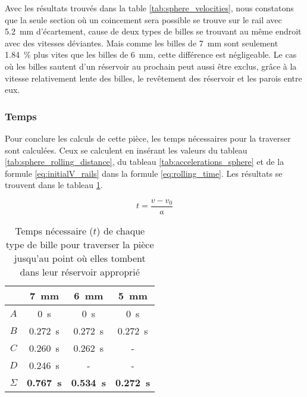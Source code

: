 Avec les résultats trouvés dans la table \ref{tab:sphere_velocities}, nous constatons que la seule section où un coincement sera possible se trouve sur le rail avec \SI{5.2}{\mm} d'écartement, cause de deux types de billes se trouvant au même endroit avec des vitesses déviantes. Mais comme les billes de \SI{7}{\mm} sont seulement \SI{1.84}{\percent} plus vites que les billes de \SI{6}{\mm}, cette différence est négligeable. Le cas où les billes sautent d'un réservoir au prochain peut aussi être exclus, grâce à la vitesse relativement lente des billes, le revêtement des réservoir et les parois entre eux.

\subsubsection{Temps}

Pour conclure les calculs de cette pièce, les temps nécessaires pour la traverser sont calculées. Ceux se calculent en insérant les valeurs du tableau \ref{tab:sphere_rolling_distance}, du tableau \ref{tab:accelerations_sphere} et de la formule \ref{eq:initialV_rails} dans la formule \ref{eq:rolling_time}. Les résultats se trouvent dans le tableau \ref{tab:results_rolling_time}.

\begin{equation}
     t = \frac{v - v_{0}}{a}
     \label{eq:rolling_time}
\end{equation}

\begin{table}[htbp]
    \centering
    \begin{tabular}{|c|c|c|c|}
        \hline
         & \SI{7}{\mm} & \SI{6}{\mm} & \SI{5}{\mm} \\
        \hline
        $A$ & \SI{0}{\s} & \SI{0}{\s} & \SI{0}{\s} \\
        \hline
        $B$ & \SI{0.272}{\s} & \SI{0.272}{\s} & \SI{0.272}{\s} \\
        \hline
        $C$ & \SI{0.260}{\s} & \SI{0.262}{\s} & - \\
        \hline
        $D$ & \SI{0.246}{\s} & - & - \\
        \hline\hline
        $\Sigma$ & \textbf{\SI{0.767}{\s}} & \textbf{\SI{0.534}{\s}} & \textbf{\SI{0.272}{\s}} \\
        \hline
    \end{tabular}
    \caption{Temps nécessaire ($t$) de chaque type de bille pour traverser la pièce jusqu'au point où elles tombent dans leur réservoir approprié}
    \label{tab:results_rolling_time}
\end{table}


